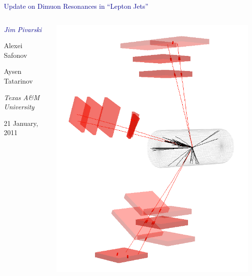 \documentclass[compress]{beamer}
\begin{document}
\begin{frame}
\vfill
\begin{center}
\textcolor{darkblue}{\Large Update on Dimuon Resonances in ``Lepton Jets''}

\vfill
\begin{columns}
\begin{center}
\large
\textcolor{darkblue}{\it Jim Pivarski}

Alexei Safonov

Aysen Tatarinov

\vspace{0.5 cm}
\scriptsize
{\it Texas A\&M University}

\vspace{0.5 cm}
\normalsize
21 January, 2011
\end{center}

\includegraphics[width=\linewidth]{eventdisplay_3d.png}
\end{columns}

\end{center}
\end{frame}
\end{document}
